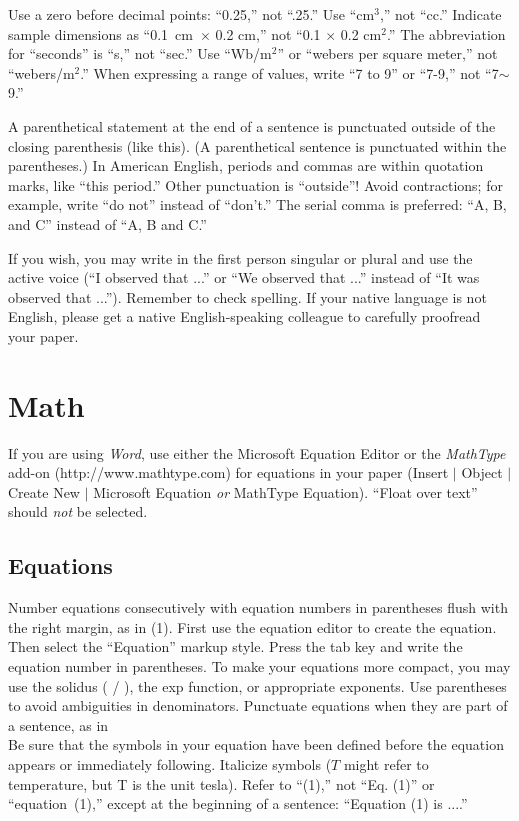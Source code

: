 \documentclass[journal]{IEEEtai}
\begin{document}
Use a zero before decimal points: ``0.25,'' not ``.25.'' Use ``cm$^3$,'' not ``cc.'' Indicate sample dimensions as ``0.1~cm~$\times$ 0.2 cm,'' not ``0.1 $\times$ 0.2 cm$^2$.'' The abbreviation for ``seconds'' is ``s,'' not ``sec.'' Use ``Wb/m$^2$'' or ``webers per square meter,'' not ``webers/m$^2$.'' When expressing a range of values, write ``7 to 9'' or ``7-9,'' not ``7$\sim$9.''

A parenthetical statement at the end of a sentence is punctuated outside of the closing parenthesis (like this). (A parenthetical sentence is punctuated within the parentheses.) In American English, periods and commas are within quotation marks, like ``this period.'' Other punctuation is ``outside''$!$ Avoid contractions; for example, write ``do not'' instead of ``don't.'' The serial comma is preferred: ``A, B, and C'' instead of ``A, B and C.''

If you wish, you may write in the first person singular or plural and use the active voice (``I observed that ...'' or ``We observed that ...'' instead of ``It was observed that ...''). Remember to check spelling. If your native language is not English, please get a native English-speaking colleague to carefully proofread your paper.

\section{Math}

If you are using {\it Word}, use either the Microsoft Equation Editor or the {\it MathType} add-on (http://www.mathtype.com) for equations in your paper (Insert $|$ Object $|$ Create New $|$ Microsoft Equation {\it or} MathType Equation). ``Float over text'' should {\it not} be selected.

\subsection{Equations}

Number equations consecutively with equation numbers in parentheses flush with the right margin, as in (1). First use the equation editor to create the equation. Then select the ``Equation'' markup style. Press the tab key and write the equation number in parentheses. To make your equations more compact, you may use the solidus ( / ), the exp function, or appropriate exponents. Use parentheses to avoid ambiguities in denominators. Punctuate equations when they are part of a sentence, as in
\begin{equation}
\!
\end{equation}
Be sure that the symbols in your equation have been defined before the equation appears or immediately following. Italicize symbols ($T$ might refer to temperature, but T is the unit tesla). Refer to ``(1),'' not ``Eq. (1)'' or ``equation~(1),'' except at the beginning of a sentence: ``Equation (1) is ....''
\end{document}
